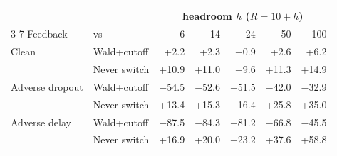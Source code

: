 \begin{tabular}{@{}l l r r r r r @{}}
\toprule
 & & \multicolumn{5}{c}{headroom $h$ ($R=10+h$)} \\
\cmidrule(lr){3-7}
Feedback & vs & 6 & 14 & 24 & 50 & 100 \\
\midrule
Clean & Wald+cutoff & +2.2 & +2.3 & +0.9 & +2.6 & +6.2 \\
 & Never switch & +10.9 & +11.0 & +9.6 & +11.3 & +14.9 \\
Adverse dropout & Wald+cutoff & $-$54.5 & $-$52.6 & $-$51.5 & $-$42.0 & $-$32.9 \\
 & Never switch & +13.4 & +15.3 & +16.4 & +25.8 & +35.0 \\
Adverse delay & Wald+cutoff & $-$87.5 & $-$84.3 & $-$81.2 & $-$66.8 & $-$45.5 \\
 & Never switch & +16.9 & +20.0 & +23.2 & +37.6 & +58.8 \\
\bottomrule
\end{tabular}
